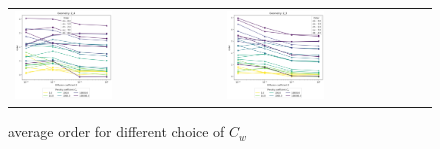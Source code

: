 \begin{example}
\begin{figure}[h!]
	\centering
	\begin{tabular}{p{} p{}}
		\vspace{0pt} 
		\includegraphics[width=0.49\textwidth]{../figs/parametric/advdiff_2D/ord_quarteroni1_2_4}
		&
		\vspace{0pt} 
		\includegraphics[width=0.49\textwidth]{../figs/parametric/advdiff_2D/ord_quarteroni1_2_3}
	\end{tabular}
	
	\caption{ average order for different choice of $C_w$}
	\label{fig:orders_quarteroni1}
\end{figure}



\end{example}
